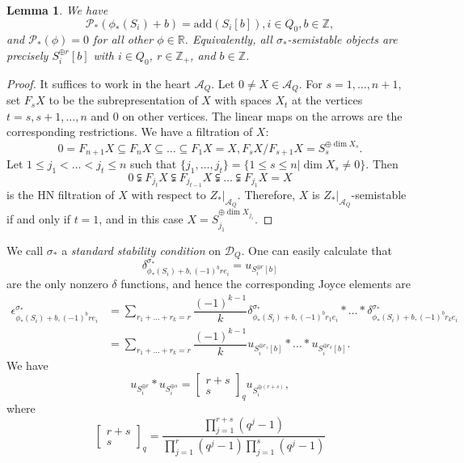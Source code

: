 \documentclass[a4paper,12pt]{amsart}
\numberwithin{equation}{section}
\newtheorem{lemma}[theorem]{Lemma}
\newcommand{\add}{\mathrm{add}}
\newcommand{\1}{\mathbf{1}}
\begin{document}
\begin{lemma}
\label{standard stability condition}
We have
\[\mathcal{P}_*(\phi_*(S_i)+b)=\add(S_i[b])
 ,i\in Q_0,b\in\mathbb{Z},\]
and $\mathcal{P}_*(\phi)=0$ for all other $\phi\in\mathbb{R}$. Equivalently, all $\sigma_*$-semistable objects are precisely $S_i^{\oplus r}[b]$ with $i\in Q_0$, $r\in\mathbb{Z}_+$, and $b\in\mathbb{Z}$.
\end{lemma}
\begin{proof}
    It suffices to work in the heart $\mathcal{A}_Q$. Let $0\neq X\in\mathcal{A}_Q$. For $s=1,\dots,n+1$, set $F_sX$ to be the subrepresentation of $X$ with spaces $X_t$ at the vertices $t=s,s+1,\dots,n$ and $0$ on other vertices. The linear maps on the arrows are the corresponding restrictions. We have a filtration of $X$:
    \[0=F_{n+1}X\subseteq F_nX\subseteq\dots\subseteq F_1X=X,F_sX/F_{s+1}X=S_s^{\oplus\dim X_s}.\]
    Let $1\leqslant j_1<\dots<j_t\leqslant n$ such that $\{j_1,\dots,j_t\}=\{1\leqslant s\leqslant n|\dim X_s\neq0\}$. Then
    \[0\subsetneqq F_{j_t}X\subsetneqq F_{j_{t-1}}X\subsetneqq\dots\subsetneqq F_{j_1}X=X\]
    is the HN filtration of $X$ with respect to $Z_*|_{\mathcal{A}_Q}$. Therefore, $X$ is $Z_*|_{\mathcal{A}_Q}$-semistable if and only if $t=1$, and in this case $X=S_{j_1}^{\oplus\dim X_{j_1}}$.
\end{proof}
We call $\sigma_*$ a \emph{standard stability condition} on $\mathcal{D}_Q$. One can easily calculate that
\[\delta^{\sigma_*}_{\phi_*(S_i)+b,(-1)^b re_i}=u_{S_i^{\oplus r}[b]}\]
are the only nonzero $\delta$ functions, and hence the corresponding Joyce elements are
\begin{align*}
    \epsilon^{\sigma_*}_{\phi_*(S_i)+b,(-1)^b re_i}&=\sum_{r_1+\dots+r_k=r}\dfrac{(-1)^{k-1}}{k}\delta^{\sigma_*}_{\phi_*(S_i)+b,(-1)^b r_1e_i}*\dots*\delta^{\sigma_*}_{\phi_*(S_i)+b,(-1)^b r_ke_i}\\
    &=\sum_{r_1+\dots+r_k=r}\dfrac{(-1)^{k-1}}{k}u_{S_i^{\oplus r_1}[b]}*\dots*u_{S_i^{\oplus r_k}[b]}.
\end{align*}
We have
\[u_{S_i^{\oplus r}}*u_{S_i^{\oplus s}}=\left[\begin{array}{c}
     r+s  \\
     s 
\end{array}\right]_q u_{S_i^{\oplus(r+s)}},\]
where
\[\left[\begin{array}{c}
     r+s  \\
     s 
\end{array}\right]_q=\frac{\displaystyle{\prod_{j=1}^{r+s}(q^j-1)}}{\displaystyle{\prod_{j=1}^{r}(q^j-1)\prod_{j=1}^{s}(q^j-1)}}\]
\end{document}
